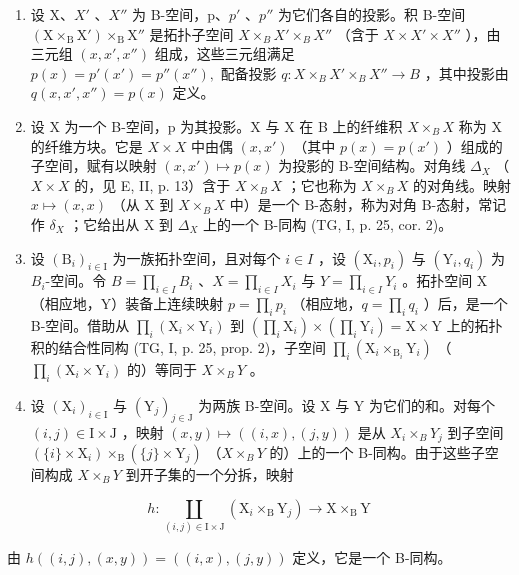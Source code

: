 \begin{enumerate}
\def\labelenumi{\arabic{enumi})}
\setcounter{enumi}{1}
\item
  设 X、\(X'\) 、\(X''\) 为 B-空间，p、\(p'\) 、\(p''\) 为它们各自的投影。积 B-空间 \((\mathrm{X} \times_{\mathrm{B}} \mathrm{X}') \times_{\mathrm{B}} \mathrm{X}''\) 是拓扑子空间 \(X \times_{B} X' \times_{B} X''\) （含于 \(X \times X' \times X''\) ），由三元组 \((x, x', x'')\) 组成，这些三元组满足 \(p(x) = p'(x') = p''(x''), \text{ 配备投影 } q: X \times_{B} X' \times_{B} X'' \to B\) ，其中投影由 \(q(x, x', x'') = p(x)\) 定义。
\item
  设 X 为一个 B-空间，p 为其投影。X 与 X 在 B 上的纤维积 \(X \times_{B} X\) 称为 X 的纤维方块。它是 \(X \times X\) 中由偶 \((x, x')\) （其中 \(p(x) = p(x')\) ）组成的子空间，赋有以映射 \((x, x') \mapsto p(x)\) 为投影的 B-空间结构。对角线 \(\Delta_{X}\) （\(X \times X\) 的，见 E, II, p. 13）含于 \(X \times_{B} X\) ；它也称为 \(X \times_{B} X\) 的对角线。映射 \(x \mapsto (x, x)\) （从 X 到 \(X \times_{B} X\) 中）是一个 B-态射，称为对角 B-态射，常记作 \(\delta_{X}\) ；它给出从 X 到 \(\Delta_{X}\) 上的一个 B-同构 (TG, I, p. 25, cor. 2)。
\item
  设 \((\mathrm{B}_{i})_{i\in\mathrm{I}}\) 为一族拓扑空间，且对每个 \(i\in I\) ，设 \((\mathrm{X}_{i},p_{i})\) 与 \((\mathrm{Y}_{i},q_{i})\) 为 \(B_{i}\)-空间。令 \(B=\prod_{i\in I}B_{i}\) 、\(X=\prod_{i\in I}X_{i}\) 与 \(Y=\prod_{i\in I}Y_{i}\) 。拓扑空间 X（相应地，Y）装备上连续映射 \(p=\prod_{i}p_{i}\) （相应地，\(q=\prod_{i}q_{i}\) ）后，是一个 B-空间。借助从 \(\prod_{i}(\mathrm{X}_{i}\times\mathrm{Y}_{i})\) 到 \((\prod_{i}\mathrm{X}_{i})\times(\prod_{i}\mathrm{Y}_{i})=\mathrm{X}\times\mathrm{Y}\) 上的拓扑积的结合性同构 (TG, I, p. 25, prop. 2)，子空间 \(\prod_{i}(\mathrm{X}_{i}\times_{\mathrm{B}_{i}}\mathrm{Y}_{i})\) （\(\prod_{i}(\mathrm{X}_{i}\times\mathrm{Y}_{i})\) 的）等同于 \(X\times_{B}Y\) 。
\item
  设 \((\mathrm{X}_{i})_{i\in\mathrm{I}}\) 与 \((\mathrm{Y}_{j})_{j\in\mathrm{J}}\) 为两族 B-空间。设 X 与 Y 为它们的和。对每个 \((i,j)\in\mathrm{I}\times\mathrm{J}\) ，映射 \((x,y)\mapsto((i,x),(j,y))\) 是从 \(X_{i}\times_{B}Y_{j}\) 到子空间 \((\{i\}\times\mathrm{X}_{i})\times_{\mathrm{B}}(\{j\}\times\mathrm{Y}_{j})\) （\(X\times_{B}Y\) 的）上的一个 B-同构。由于这些子空间构成 \(X\times_{B}Y\) 到开子集的一个分拆，映射
\end{enumerate}

\[
h \colon \coprod_ {(i, j) \in \mathrm{I} \times \mathrm{J}} (\mathrm{X} _ {i} \times_ {\mathrm{B}} \mathrm{Y} _ {j}) \to \mathrm{X} \times_ {\mathrm{B}} \mathrm{Y}
\]

由 \(h((i,j),(x,y)) = ((i,x),(j,y))\) 定义，它是一个 B-同构。

